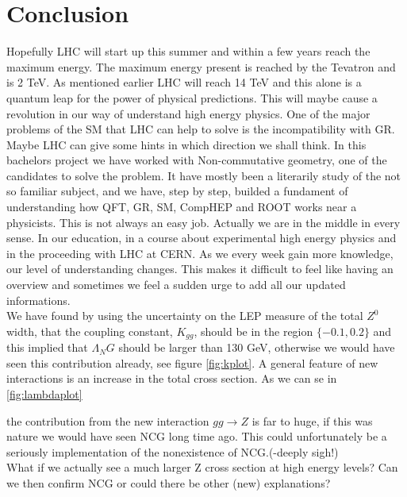 \section{Conclusion}
Hopefully LHC will start up this summer and within a few years reach the maximum energy. The maximum energy present is reached by the Tevatron and is 2 TeV. As mentioned earlier LHC will reach 14 TeV and this alone is a quantum leap for the power of physical predictions. This will maybe cause a revolution in our way of understand high energy physics. One of the major problems of the SM that LHC can help to solve is the incompatibility with GR. Maybe LHC can give some hints in which direction we shall think. In this bachelors project we have worked with Non-commutative geometry, one of the candidates to solve the problem. It have mostly been a literarily study of the not so familiar subject, and we have, step by step, builded a fundament of understanding how QFT, GR, SM, CompHEP and ROOT works near a physicists. This is not always an easy job. Actually we are in the middle in every sense. In our education, in a course about experimental high energy physics and in the proceeding with LHC at CERN. As we every week gain more knowledge, our level of understanding changes. This makes it difficult to feel like having an overview and sometimes we feel a sudden urge to add all our updated informations. \\


We have found by using the uncertainty on the LEP measure of the total $Z^0$ width, that the coupling constant, $K_{gg}$, should be in the region $\{-0.1,0.2\}$ and this implied that $\Lambda_NG$ should be larger than 130 GeV, otherwise we would have seen this contribution already, see figure \ref{fig:kplot}. A general feature of new interactions is an increase in the total cross section. As we can se in \ref{fig:lambdaplot}


the contribution from the new interaction $gg \rightarrow Z$ is far to huge, if this was nature we would have seen NCG long time ago. This could unfortunately be a seriously implementation of the nonexistence of NCG.(-deeply sigh!)\\

What if we actually see a much larger Z cross section at high energy levels? Can we then confirm NCG or could there be other (new) explanations?
